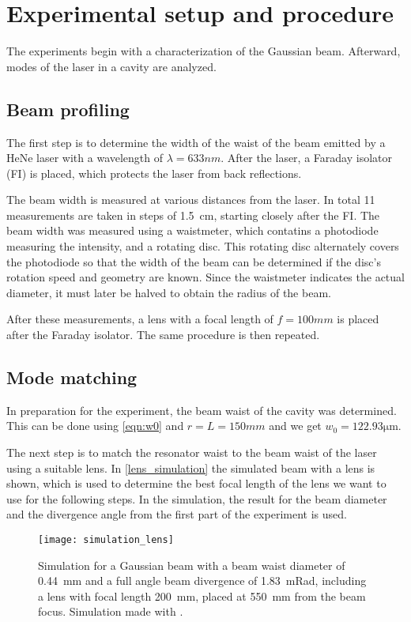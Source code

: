 \section{Experimental setup and procedure}\label{sec:procedure}
The experiments begin with a characterization of the Gaussian beam. Afterward, modes of the laser in a cavity are analyzed. 

\subsection{Beam profiling}
The first step is to determine the width of the waist of the beam emitted by a HeNe laser with a wavelength of \( \lambda = 633 \unit{nm} \). After the laser, a Faraday isolator (FI) is placed, which protects the laser from back reflections.

The beam width is measured at various distances from the laser. In total 11 measurements are taken in steps of \SI{1.5}{cm}, starting closely after the FI. The beam width was measured using a waistmeter, which contatins a photodiode measuring the intensity, and a rotating disc. This rotating disc alternately covers the photodiode so that the width of the beam can be determined if the disc's rotation speed and geometry are known. Since the waistmeter indicates the actual diameter, it must later be halved to obtain the radius of the beam.

After these measurements, a lens with a focal length of $f = 100 \unit{mm}$ is placed after the Faraday isolator. The same procedure is then repeated.

\subsection{Mode matching}
\label{subsec:mode}
In preparation for the experiment, the beam waist of the cavity was determined. This can be done using \autoref{eqn:w0} and $r = L = 150 \unit{mm}$ and we get $w_0 = 122.93 \unit{\micro\m}$. 

The next step is to match the resonator waist to the beam waist of the laser using a suitable lens. In \autoref{lens_simulation} the simulated beam with a lens is shown, which is used to determine the best focal length of the lens we want to use for the following steps. In the simulation, the result for the beam diameter and the divergence angle from the first part of the experiment is used. 

\begin{figure}[H]
	\centering
	\texttt{[image: simulation\_lens]}
	\caption{Simulation for a Gaussian beam with a beam waist diameter of \SI{0.44}{mm} and a full angle beam divergence of \SI{1.83}{mRad}, including a lens with focal length \SI{200}{mm}, placed at \SI{550}{mm} from the beam focus. Simulation made with \cite{lightmachinery}.} 
	\label{lens_simulation}
\end{figure}

